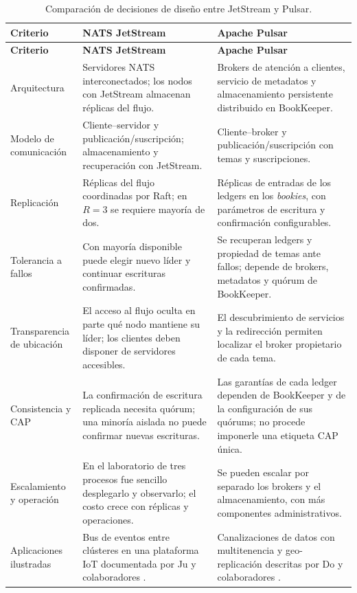 \documentclass[12pt,a4paper]{article}
\begin{document}
\begingroup\small
\begin{longtable}{@{}p{3.05cm}p{5.25cm}p{5.25cm}@{}}
\caption{Comparación de decisiones de diseño entre JetStream y Pulsar.}\label{tab:comparacion}\\
\toprule
\textbf{Criterio} & \textbf{NATS JetStream} & \textbf{Apache Pulsar} \\\midrule
\endfirsthead
\toprule
\textbf{Criterio} & \textbf{NATS JetStream} & \textbf{Apache Pulsar} \\\midrule
\endhead
Arquitectura & Servidores NATS interconectados; los nodos con JetStream almacenan réplicas del flujo. & Brokers de atención a clientes, servicio de metadatos y almacenamiento persistente distribuido en BookKeeper. \\
Modelo de comunicación & Cliente--servidor y publicación/suscripción; almacenamiento y recuperación con JetStream. & Cliente--broker y publicación/suscripción con temas y suscripciones. \\
Replicación & Réplicas del flujo coordinadas por Raft; en \(R=3\) se requiere mayoría de dos. & Réplicas de entradas de los ledgers en los \emph{bookies}, con parámetros de escritura y confirmación configurables. \\
Tolerancia a fallos & Con mayoría disponible puede elegir nuevo líder y continuar escrituras confirmadas. & Se recuperan ledgers y propiedad de temas ante fallos; depende de brokers, metadatos y quórum de BookKeeper. \\
Transparencia de ubicación & El acceso al flujo oculta en parte qué nodo mantiene su líder; los clientes deben disponer de servidores accesibles. & El descubrimiento de servicios y la redirección permiten localizar el broker propietario de cada tema. \\
Consistencia y CAP & La confirmación de escritura replicada necesita quórum; una minoría aislada no puede confirmar nuevas escrituras. & Las garantías de cada ledger dependen de BookKeeper y de la configuración de sus quórums; no procede imponerle una etiqueta CAP única. \\
Escalamiento y operación & En el laboratorio de tres procesos fue sencillo desplegarlo y observarlo; el costo crece con réplicas y operaciones. & Se pueden escalar por separado los brokers y el almacenamiento, con más componentes administrativos. \\
Aplicaciones ilustradas & Bus de eventos entre clústeres en una plataforma IoT documentada por Ju y colaboradores \cite{ju2026}. & Canalizaciones de datos con multitenencia y geo-replicación descritas por Do y colaboradores \cite{do2025}. \\
\bottomrule
\end{longtable}
\endgroup
\end{document}
